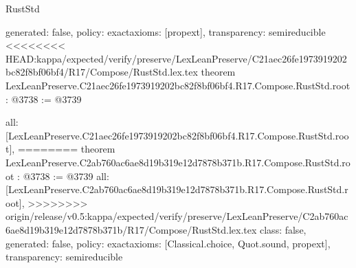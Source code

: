 \begin{lexlean}{RustStd}
\begin{coremodule}
{\begin{coremodule}
{{{{  generated: false,
  policy: exact{axioms: [propext]},
  transparency: semireducible
}
<<<<<<<< HEAD:kappa/expected/verify/preserve/LexLeanPreserve/C21aec26fe1973919202bc82f8bf06bf4/R17/Compose/RustStd.lex.tex
theorem LexLeanPreserve.C21aec26fe1973919202bc82f8bf06bf4.R17.Compose.RustStd.root : @3738 := @3739 {
  all: [LexLeanPreserve.C21aec26fe1973919202bc82f8bf06bf4.R17.Compose.RustStd.root],
========
theorem LexLeanPreserve.C2ab760ac6ae8d19b319e12d7878b371b.R17.Compose.RustStd.root : @3738 := @3739 {
  all: [LexLeanPreserve.C2ab760ac6ae8d19b319e12d7878b371b.R17.Compose.RustStd.root],
>>>>>>>> origin/release/v0.5:kappa/expected/verify/preserve/LexLeanPreserve/C2ab760ac6ae8d19b319e12d7878b371b/R17/Compose/RustStd.lex.tex
  class: false,
  generated: false,
  policy: exact{axioms: [Classical.choice, Quot.sound, propext]},
  transparency: semireducible
}

}}}}
\end{coremodule}}
\end{coremodule}
\end{lexlean}
